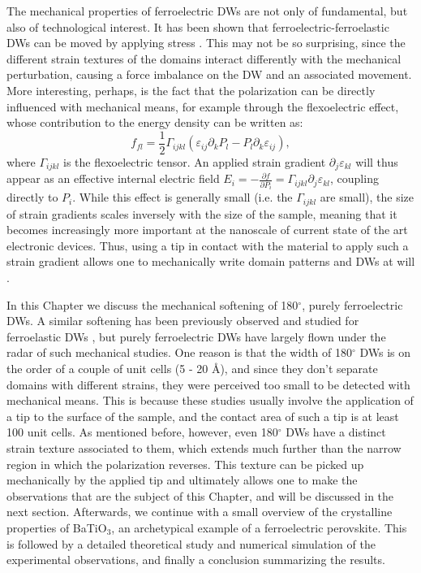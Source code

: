 The mechanical properties of ferroelectric DWs are not only of fundamental, but also of technological interest.
It has been shown that ferroelectric-ferroelastic DWs can be moved by applying stress \cite{Schneider2001}.
This may not be so surprising, since the different strain textures of the domains interact differently with the mechanical perturbation, causing a force imbalance on the DW and an associated movement.
More interesting, perhaps, is the fact that the polarization can be directly influenced with mechanical means, for example through the flexoelectric effect, whose contribution to the energy density can be written as:
\begin{equation}
	\label{eq:BTO_flexoelectricity}
	f_{fl} = \frac{1}{2}\Gamma_{ijkl}(\varepsilon_{ij}\partial_kP_l-P_l\partial_k\varepsilon_{ij}),
\end{equation}
where $\Gamma_{ijkl}$ is the flexoelectric tensor.
An applied strain gradient $\partial_j\varepsilon_{kl}$ will thus appear as an effective internal electric field $E_{i} = -\frac{\partial f}{\partial P_i} = \Gamma_{ijkl}\partial_j\varepsilon_{kl}$, coupling directly to $P_i$.
While this effect is generally small (i.e. the $\Gamma_{ijkl}$ are small), the size of strain gradients scales inversely with the size of the sample, meaning that it becomes increasingly more important at the nanoscale of current state of the art electronic devices.
Thus, using a tip in contact with the material to apply such a strain gradient allows one to mechanically write domain patterns and DWs at will \cite{Lu2012,Abdollahi2015, Cordero-Edwards2017,Cordero-Edwards2019}.

In this Chapter we discuss the mechanical softening of 180$^\circ$, purely ferroelectric DWs.
A similar softening has been previously observed and studied for ferroelastic DWs \cite{Lee2003,Scott2012}, but purely ferroelectric DWs have largely flown under the radar of such mechanical studies.
One reason is that the width of 180$^\circ$ DWs is on the order of a couple of unit cells (5 - 20 \AA \cite{Zhirnov1959}), and since they don't separate domains with different strains, they were perceived too small to be detected with mechanical means.
This is because these studies usually involve the application of a tip to the surface of the sample, and the contact area of such a tip is at least 100 unit cells.
As mentioned before, however, even 180$^\circ$ DWs have a distinct strain texture associated to them, which extends much further than the narrow region in which the polarization reverses.
This texture can be picked up mechanically by the applied tip and ultimately allows one to make the observations that are the subject of this Chapter, and will be discussed in the next section.
Afterwards, we continue with a small overview of the crystalline properties of BaTiO$_3$, an archetypical example of a ferroelectric perovskite.
This is followed by a detailed theoretical study and numerical simulation of the experimental observations, and finally a conclusion summarizing the results.

